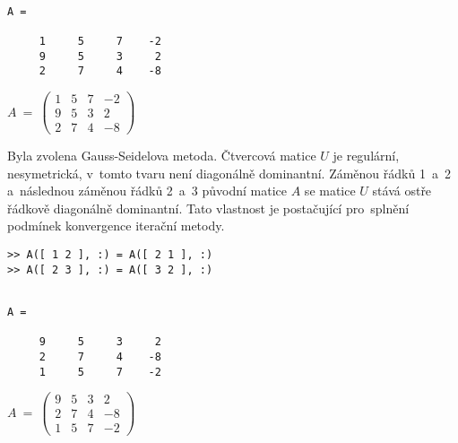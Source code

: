 \documentclass[a4paper,10pt]{article}
\begin{document}
\begin{minipage}[t]{.5\textwidth}
\begin{verbatim}

A =

     1     5     7    -2
     9     5     3     2
     2     7     4    -8

\end{verbatim}
\end{minipage}%
\begin{minipage}[t]{.5\textwidth}

\bigskip
\bigskip

$
A~=~
\left( \begin{array}{rrr|r}
1 & 5 & 7 & -2 \\
9 & 5 & 3 &  2 \\
2 & 7 & 4 & -8
\end{array} \right)
$

\vfill

\end{minipage}

\par Byla zvolena Gauss-Seidelova metoda. Čtvercová matice $U$ je regulární, nesymetrická,
v~tomto tvaru není diagonálně dominantní. Záměnou řádků 1~a~2 a~následnou záměnou řádků
2~a~3 původní matice $A$ se matice $U$ stává ostře řádkově diagonálně dominantní. Tato
vlastnost je postačující pro~splnění podmínek konvergence iterační metody. \\

\begin{verbatim}
>> A([ 1 2 ], :) = A([ 2 1 ], :)
>> A([ 2 3 ], :) = A([ 3 2 ], :)
\end{verbatim}

\begin{minipage}[t]{.5\textwidth}
\begin{verbatim}

A =

     9     5     3     2
     2     7     4    -8
     1     5     7    -2

\end{verbatim}
\end{minipage}%
\begin{minipage}[t]{.5\textwidth}

\bigskip
\bigskip

$
A~=~
\left( \begin{array}{rrr|r}
9 & 5 & 3 &  2 \\
2 & 7 & 4 & -8 \\
1 & 5 & 7 & -2 
\end{array} \right)
$

\vfill
\end{minipage}
\end{document}
